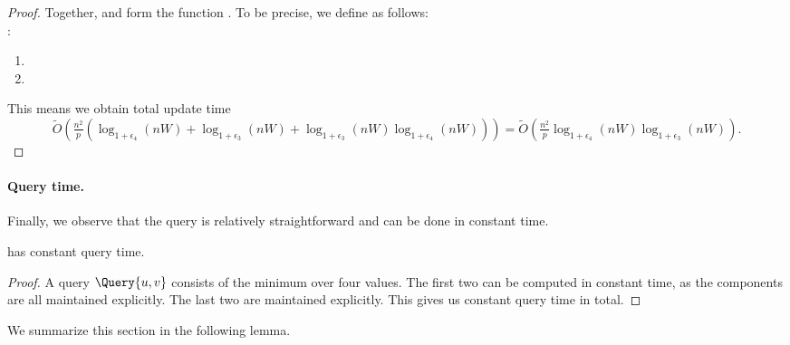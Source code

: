 \begin{proof}
   Together, \UpdateNbrBunchDSBunchChange and \UpdateAdjacentDSBunchChange form the function \UpdateAdjacentDS. To be precise, we define \UpdateAdjacentDS as follows: \\
:
\begin{enumerate}
    \item {}
    \item {}
\end{enumerate}
This means we obtain total update time $$\tilde O(\tfrac{n^2}{p}(\log_{1+\epsilon_4}(nW)+\log_{1+\epsilon_3}(nW)+\log_{1+\epsilon_3}(nW)\log_{1+\epsilon_4}(nW)))=\tilde O(\tfrac{n^2}{p}\log_{1+\epsilon_4}(nW)\log_{1+\epsilon_3}(nW)).$$
\end{proof}

\paragraph{Query time.}
Finally, we observe that the query is relatively straightforward and can be done in constant time. 

\begin{lemma}
    \DynAPSPtwo has constant query time. 
\end{lemma}
\begin{proof}
    A query $\Query{u,v}$ consists of the minimum over four values. The first two can be computed in constant time, as the components are all maintained explicitly. The last two are maintained explicitly. This gives us constant query time in total. 
\end{proof}



We summarize this section in the following lemma. 

